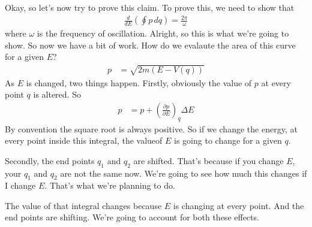 Okay,
so let's now try to prove this claim.
To prove this,
we need to show that
\begin{align}
    \frac{d}{dE}\left( 
    \oint p\, dq
    \right)
    =
    \frac{2\pi}{\omega}
\end{align}
where $\omega$ is the frequency of oscillation.
Alright, so this is what we're going to show.
So now we have a bit of work.
How do we evalaute the area of this curve for a given $E$?
\begin{align}
    p &=
    \sqrt{2m\left( E - V(q) \right)}
\end{align}
As $E$ is changed, two things happen.
Firstly,
obviously the value of $p$ at every point $q$ is altered.
So
\begin{align}
    p &=
    p
    +
    \left( \frac{\partial p}{\partial E}\right)_q
    \Delta E
\end{align}
By convention the square root is always positive.
So if we change the energy,
at every point inside this integral,
the valueof $E$ is going to change for a given $q$.

Secondly,
the end points $q_1$ and $q_2$ are shifted.
That's because if you change $E$,
your $q_1$ and $q_2$ are not the same now.
We're going to see how much this changes if I change $E$.
That's what we're planning to do.

The value of that integral changes because $E$ is changing at every point.
And the end points are shifting.
We're going to account for both these effects.
